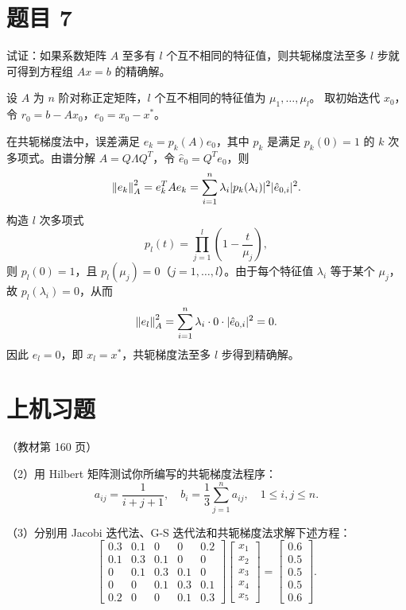 \documentclass{article}
\begin{document}
\section{题目 7}

试证：如果系数矩阵 $A$ 至多有 $l$ 个互不相同的特征值，则共轭梯度法至多 $l$ 步就可得到方程组 $Ax = b$ 的精确解。

\begin{solution}
  设 $A$ 为 $n$ 阶对称正定矩阵，$l$ 个互不相同的特征值为 $\mu_1, \dots, \mu_l$。
  取初始迭代 $x_0$，令 $r_0 = b - Ax_0$，$e_0 = x_0 - x^*$。

  在共轭梯度法中，误差满足 $e_k = p_k(A) e_0$，其中 $p_k$ 是满足 $p_k(0) = 1$ 的 $k$
  次多项式。由谱分解 $A = Q\Lambda Q^T$，令 $\hat{e}_0 = Q^T e_0$，则
  \[
    \left\| e_k \right\|_A^2 = e_k^T A e_k = \sum_{i=1}^n \lambda_i |p_k(\lambda_i)|^2
    |\hat{e}_{0,i}|^2.
  \]
  构造 $l$ 次多项式
  \[
    p_l(t) = \prod_{j=1}^l \left(1 - \frac{t}{\mu_j}\right),
  \]
  则 $p_l(0) = 1$，且 $p_l(\mu_j) = 0$（$j = 1, \dots, l$）。由于每个特征值
  $\lambda_i$ 等于某个 $\mu_j$，故 $p_l(\lambda_i) = 0$，从而
  \[
    \left\| e_l \right\|_A^2 = \sum_{i=1}^n \lambda_i \cdot 0 \cdot |\hat{e}_{0,i}|^2 = 0.
  \]
  因此 $e_l = 0$，即 $x_l = x^*$，共轭梯度法至多 $l$ 步得到精确解。
\end{solution}

\section{上机习题}

（教材第 160 页）

（2）用 Hilbert 矩阵测试你所编写的共轭梯度法程序：
\[
  a_{ij} = \frac{1}{i+j+1}, \quad b_i = \frac{1}{3} \sum_{j=1}^{n}
  a_{ij}, \quad 1 \leq i, j \leq n.
\]

（3）分别用 Jacobi 迭代法、G-S 迭代法和共轭梯度法求解下述方程：
\[
  \begin{bmatrix}
    0.3 & 0.1 & 0 & 0 & 0.2 \\
    0.1 & 0.3 & 0.1 & 0 & 0 \\
    0 & 0.1 & 0.3 & 0.1 & 0 \\
    0 & 0 & 0.1 & 0.3 & 0.1 \\
    0.2 & 0 & 0 & 0.1 & 0.3
  \end{bmatrix}
  \begin{bmatrix} x_1 \\ x_2 \\ x_3 \\ x_4 \\ x_5
  \end{bmatrix}
  =
  \begin{bmatrix} 0.6 \\ 0.5 \\ 0.5 \\ 0.5 \\ 0.6
  \end{bmatrix}.
\]
\end{document}

